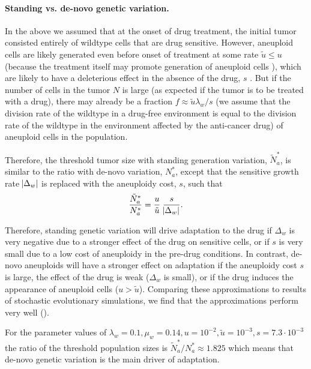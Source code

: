\documentclass[12pt]{extarticle}
\begin{document}
\paragraph*{Standing vs. de-novo genetic variation.}

In the above we assumed that at the onset of drug treatment, the initial tumor consisted entirely of wildtype cells that are drug sensitive.
However, aneuploid cells are likely generated even before onset of treatment at some rate $\tilde{u} \le u$ (because the treatment itself may promote generation of aneuploid cells \citep{wang2019molecular,mason2017functional}), which are likely to have a deleterious effect in the absence of the drug, $s$ \citep{replogle2020aneuploidy,giam2015aneuploidy}.
But if the number of cells in the tumor $N$ is large (as expected if the tumor is to be treated with a drug), there may already be a fraction $f \approx \tilde{u}\lambda_w/s$ (we assume that the division rate of the wildtype in a drug-free environment is equal to the division rate of the wildtype in the environment affected by the anti-cancer drug) of aneuploid cells in the population.

Therefore, the threshold tumor size with standing generation variation, $\tilde{N}^*_{a}$, is similar to the ratio with de-novo variation, $N^*_a$, except that the sensitive growth rate $\abs{\Delta_w}$ is replaced with the aneuploidy cost, $s$, such that 
\begin{equation}\label{eq:Nsgv}
\frac{\tilde{N}^*_{a}}{N^*_{a}} = \frac{u}{\tilde{u}} \; \frac{s}{\abs{\Delta_w}}.
\end{equation}

Therefore, standing genetic variation will drive adaptation to the drug if $\Delta_w$ is very negative due to a stronger effect of the drug on sensitive cells, or if $s$ is very small due to a low cost of aneuploidy in the pre-drug conditions.
In contrast, de-novo aneuploids will have a stronger effect on adaptation if the aneuploidy cost $s$ is large, the effect of the drug is weak ($\Delta_w$ is small), or if the drug induces the appearance of aneuploid cells ($u > \tilde u$). Comparing these approximations to results of stochastic evolutionary simulations, we find that the approximations perform very well ().  

For the parameter values of  $\lambda_w=0.1,\mu_w=0.14, u=10^{-2}, \tilde{u}=10^{-3}, s=7.3\cdot10^{-3}$ the ratio of the threshold population sizes is $\tilde{N}^*_a/N^*_a\approx1.825$ which means that de-novo genetic variation is  the main driver of adaptation.
\end{document}
